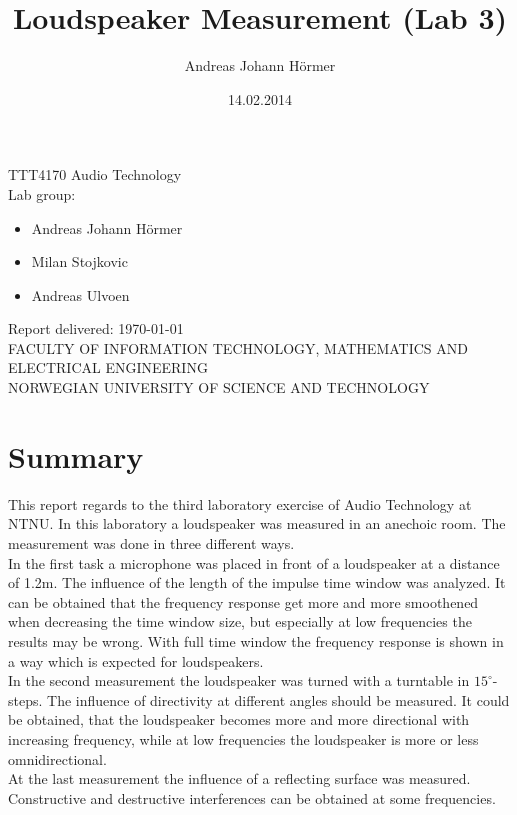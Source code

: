 \documentclass{article}
\title{Loudspeaker Measurement (Lab 3)}
\author{Andreas Johann H\"ormer}
\date{14.02.2014}
\begin{document}
\thispagestyle{empty}
\maketitle
\thispagestyle{empty}
\begin{center}
TTT4170 Audio Technology\\[3cm]
Lab group:
\begin{itemize}
\item Andreas Johann H\"ormer
\item Milan Stojkovic
\item Andreas Ulvoen\\[3cm]
\end{itemize}
Report delivered: \today\\[6cm]
FACULTY OF INFORMATION TECHNOLOGY, MATHEMATICS AND ELECTRICAL ENGINEERING\\
NORWEGIAN UNIVERSITY OF SCIENCE AND TECHNOLOGY
\end{center}
\thispagestyle{empty}
\tableofcontents
\thispagestyle{empty}
\newpage
\section*{Summary}
\thispagestyle{empty}
This report regards to the third laboratory exercise of Audio Technology at NTNU. In this laboratory a loudspeaker was measured in an anechoic room. The measurement was done in three different ways.\\
In the first task a microphone was placed in front of a loudspeaker at a distance of 1.2m. The influence of the length of the impulse time window was analyzed. It can be obtained that the frequency response get more and more smoothened when decreasing the time window size, but especially at low frequencies the results may be wrong. With full time window the frequency response is shown in a way which is expected for loudspeakers.\\
In the second measurement the loudspeaker was turned with a turntable in $15^\circ$-steps. The influence of directivity at different angles should be measured. It could be obtained, that the loudspeaker becomes more and more directional with increasing frequency, while at low frequencies the loudspeaker is more or less omnidirectional.\\
At the last measurement the influence of a reflecting surface was measured. Constructive and destructive interferences can be obtained at some frequencies.
\newpage
\setcounter{page}{1}
\end{document}

